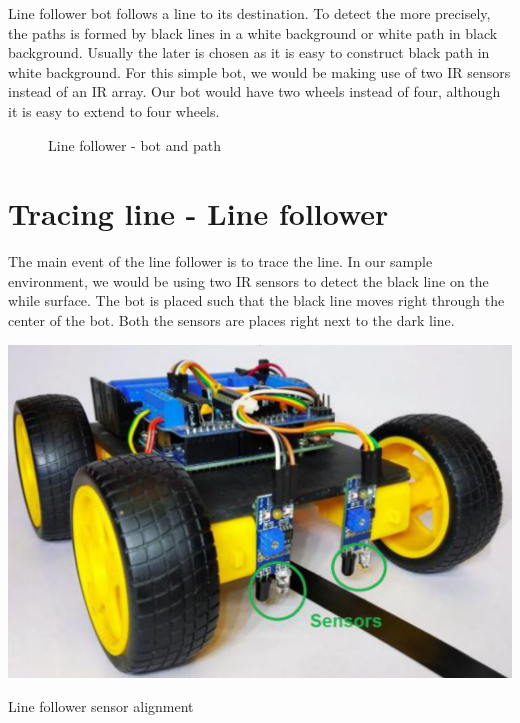 Line follower bot follows a line to its destination. To detect the more precisely, the paths is formed by black lines in a white background or white path in black background. Usually the later is chosen as it is easy to construct black path in white background. For this simple bot, we would be making use of two \ac{IR} sensors instead of an \ac{IR} array. Our bot would have two wheels instead of four, although it is easy to extend to four wheels.

\begin{figure}
    \quad
    \caption{Line follower - bot and path}
\end{figure}

\section{Tracing line - Line follower}

The main event of the line follower is to trace the line. In our sample environment, we would be using two \ac{IR} sensors to detect the black line on the while surface. The bot is placed such that the black line moves right through the center of the bot. Both the sensors are places right next to the dark line.

\begin{marginfigure}
    \includegraphics{Images/IR Sensor/sensor_align.png}
     \caption[Line Follower Sensor]{Line follower sensor alignment}
\end{marginfigure}

